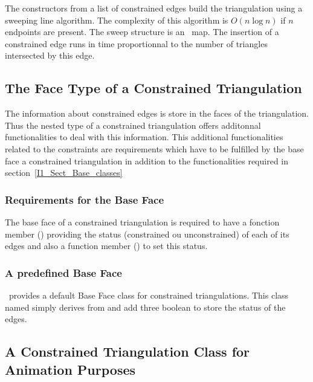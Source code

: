 
The constructors from a list of constrained edges
build the triangulation using a sweeping line
algorithm. The complexity of this algorithm is $O(n\log n)$ if $n$
endpoints are present. The sweep structure is an \stl\ map.
 The insertion of a constrained edge runs in time
proportionnal to the number of triangles intersected by this edge.



\subsection{The Face Type of a Constrained Triangulation}
\label{I1_Sect_Constrained_face}
 The information about constrained edges is store in the 
faces of the triangulation. Thus the nested 
type of a constrained triangulation offers
additonnal functionalities to deal with this information.
This additional functionalities related to the constraints
are requirements which have to be fulfilled
by the base face  a constrained triangulation
in addition to the functionalities required in section~\ref{I1_Sect_Base_classes}

\subsubsection{Requirements for the Base Face}
The base face of a constrained triangulation is required
to have a fonction member
()
 providing the status
(constrained ou unconstrained) of each of its edges
and also a function member
() to set this status.


\subsubsection{A predefined Base Face}
\cgal\ provides a default Base Face class
for constrained triangulations. This class named
simply derives from 
and add three boolean to store the status of the edges. 


\subsection{A Constrained Triangulation Class for Animation Purposes
\label{I1_Subsec_Constrained_Demo_2}}

